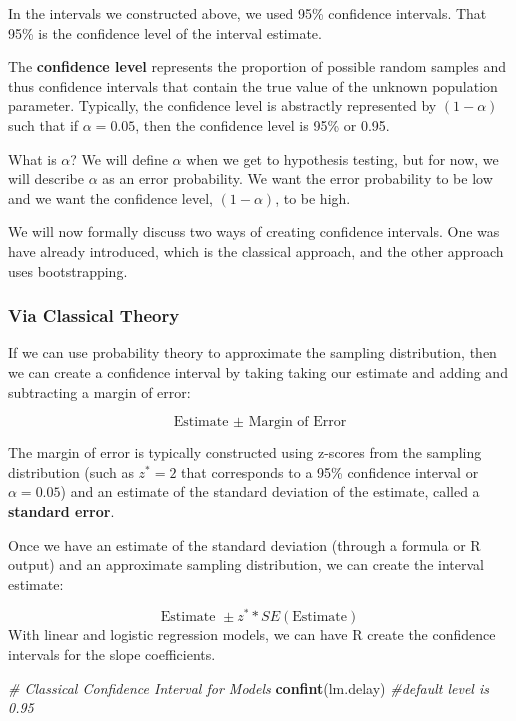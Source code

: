 \documentclass[
]{book}
\newenvironment{Shaded}{\begin{snugshade}}{\end{snugshade}}
\newcommand{\CommentTok}[1]{\textcolor[rgb]{0.56,0.35,0.01}{\textit{#1}}}
\newcommand{\FunctionTok}[1]{\textcolor[rgb]{0.13,0.29,0.53}{\textbf{#1}}}
\newcommand{\NormalTok}[1]{#1}
\begin{document}
In the intervals we constructed above, we used 95\% confidence intervals. That 95\% is the confidence level of the interval estimate.

The \textbf{confidence level} represents the proportion of possible random samples and thus confidence intervals that contain the true value of the unknown population parameter. Typically, the confidence level is abstractly represented by \((1-\alpha)\) such that if \(\alpha = 0.05\), then the confidence level is 95\% or 0.95.

What is \(\alpha\)? We will define \(\alpha\) when we get to hypothesis testing, but for now, we will describe \(\alpha\) as an error probability. We want the error probability to be low and we want the confidence level, \((1-\alpha)\), to be high.

We will now formally discuss two ways of creating confidence intervals. One was have already introduced, which is the classical approach, and the other approach uses bootstrapping.

\subsubsection{Via Classical Theory}\label{via-classical-theory}

If we can use probability theory to approximate the sampling distribution, then we can create a confidence interval by taking taking our estimate and adding and subtracting a margin of error:

\[\text{Estimate }\pm \text{ Margin of Error}\]

The margin of error is typically constructed using z-scores from the sampling distribution (such as \(z^* = 2\) that corresponds to a 95\% confidence interval or \(\alpha = 0.05\)) and an estimate of the standard deviation of the estimate, called a \textbf{standard error}.

Once we have an estimate of the standard deviation (through a formula or R output) and an approximate sampling distribution, we can create the interval estimate:

\[\text{Estimate }\pm z^* *SE(\text{Estimate})\]
With linear and logistic regression models, we can have R create the confidence intervals for the slope coefficients.

\begin{Shaded}
\begin{Highlighting}[]
\CommentTok{\# Classical Confidence Interval for Models}
\FunctionTok{confint}\NormalTok{(lm.delay) }\CommentTok{\#default level is 0.95}
\end{Highlighting}
\end{Shaded}
\end{document}
